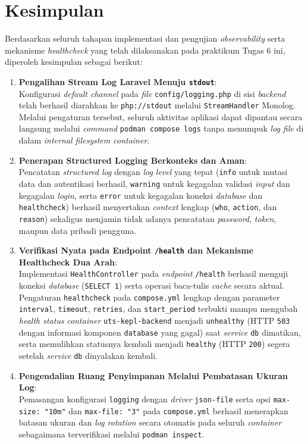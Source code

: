 \documentclass[a4paper,oneside,11pt]{book}
\begin{document}
\section{Kesimpulan}

\par Berdasarkan seluruh tahapan implementasi dan pengujian \textit{observability} serta mekanisme \textit{healthcheck} yang telah dilaksanakan pada praktikum Tugas 6 ini, diperoleh kesimpulan sebagai berikut:
\begin{enumerate}[leftmargin=*]
  \item \textbf{Pengalihan Stream Log Laravel Menuju \texttt{stdout}}:\\
        Konfigurasi \textit{default channel} pada \textit{file} \texttt{config/logging.php} di sisi \textit{backend} telah berhasil diarahkan ke \texttt{php://stdout} melalui \texttt{StreamHandler} Monolog. Melalui pengaturan tersebut, seluruh aktivitas aplikasi dapat dipantau secara langsung melalui \textit{command} \texttt{podman compose logs} tanpa menumpuk \textit{log file} di dalam \textit{internal filesystem container}.
  \item \textbf{Penerapan Structured Logging Berkonteks dan Aman}:\\
        Pencatatan \textit{structured log} dengan \textit{log level} yang tepat (\texttt{info} untuk mutasi data dan autentikasi berhasil, \texttt{warning} untuk kegagalan validasi \textit{input} dan kegagalan \textit{login}, serta \texttt{error} untuk kegagalan koneksi \textit{database} dan \texttt{healthcheck}) berhasil menyertakan \textit{context} lengkap (\texttt{who}, \texttt{action}, dan \texttt{reason}) sekaligus menjamin tidak adanya pencatatan \textit{password}, \textit{token}, maupun data pribadi pengguna.
  \item \textbf{Verifikasi Nyata pada Endpoint \texttt{/health} dan Mekanisme Healthcheck Dua Arah}:\\
        Implementasi \texttt{HealthController} pada \textit{endpoint} \texttt{/health} berhasil menguji koneksi \textit{database} (\texttt{SELECT 1}) serta operasi baca-tulis \textit{cache} secara aktual. Pengaturan \texttt{healthcheck} pada \texttt{compose.yml} lengkap dengan parameter \texttt{interval}, \texttt{timeout}, \texttt{retries}, dan \texttt{start\_period} terbukti mampu mengubah \textit{health status} \textit{container} \texttt{uts-kepl-backend} menjadi \texttt{unhealthy} (HTTP \texttt{503} dengan informasi komponen \texttt{database} yang gagal) saat \textit{service} \texttt{db} dimatikan, serta memulihkan statusnya kembali menjadi \texttt{healthy} (HTTP \texttt{200}) segera setelah \textit{service} \texttt{db} dinyalakan kembali.
  \item \textbf{Pengendalian Ruang Penyimpanan Melalui Pembatasan Ukuran Log}:\\
        Pemasangan konfigurasi \texttt{logging} dengan \textit{driver} \texttt{json-file} serta opsi \texttt{max-size: "10m"} dan \texttt{max-file: "3"} pada \texttt{compose.yml} berhasil menerapkan batasan ukuran dan \textit{log rotation} secara otomatis pada seluruh \textit{container} sebagaimana terverifikasi melalui \texttt{podman inspect}.
\end{enumerate}
\end{document}
